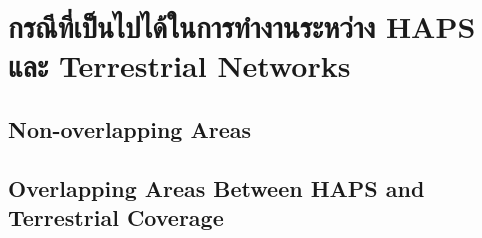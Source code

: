 \section{กรณีที่เป็นไปได้ในการทำงานระหว่าง HAPS และ Terrestrial Networks}

\subsection{Non-overlapping Areas}

\subsection{Overlapping Areas Between HAPS and Terrestrial Coverage}
